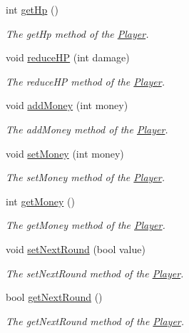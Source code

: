 \begin{DoxyCompactItemize}
int \hyperlink{class_player_aa6479f194f9bb44b09adaf3b04a5594d}{get\+Hp} ()
\begin{DoxyCompactList}\small\item\em The get\+Hp method of the \hyperlink{class_player}{Player}. \end{DoxyCompactList}\item 
void \hyperlink{class_player_ae03528c4ade65b66ed097a2b622d59a5}{reduce\+H\+P} (int damage)
\begin{DoxyCompactList}\small\item\em The reduce\+H\+P method of the \hyperlink{class_player}{Player}. \end{DoxyCompactList}\item 
void \hyperlink{class_player_a0f592e3e7e589f40dc5144d1d58283f2}{add\+Money} (int money)
\begin{DoxyCompactList}\small\item\em The add\+Money method of the \hyperlink{class_player}{Player}. \end{DoxyCompactList}\item 
void \hyperlink{class_player_a6e78f6a0e2e73323bf200a9e1c2e0ac6}{set\+Money} (int money)
\begin{DoxyCompactList}\small\item\em The set\+Money method of the \hyperlink{class_player}{Player}. \end{DoxyCompactList}\item 
int \hyperlink{class_player_ac45154df7c4eb2d1d58255c3ff1c55dd}{get\+Money} ()
\begin{DoxyCompactList}\small\item\em The get\+Money method of the \hyperlink{class_player}{Player}. \end{DoxyCompactList}\item 
void \hyperlink{class_player_a7429c38bfd16ded1b2a11af1b0673ba3}{set\+Next\+Round} (bool value)
\begin{DoxyCompactList}\small\item\em The set\+Next\+Round method of the \hyperlink{class_player}{Player}. \end{DoxyCompactList}\item 
bool \hyperlink{class_player_ad0c154bef16fa0c1c3e4c6efb124d420}{get\+Next\+Round} ()
\begin{DoxyCompactList}\small\item\em The get\+Next\+Round method of the \hyperlink{class_player}{Player}. \end{DoxyCompactList}\item 

\end{DoxyCompactItemize}

